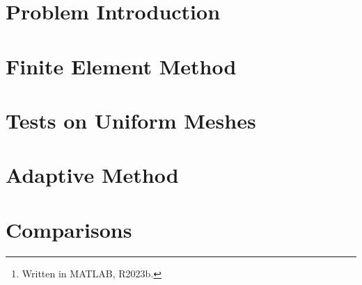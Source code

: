 \documentclass[12pt]{article}
\title{\reporttitle}
\author{Andrea Di Antonio, 858798 \\ \hyperlink{mailto:a.diantonio1@campus.unimib.it}{a.diantonio1@campus.unimib.it}}
\date{Exam session of July 27, 2023 \\ Academic Year 2022-23}
\newcommand{\reporttitle}{Adaptive 1D 1st-order Lagrange FEM}
\begin{document}
	\maketitle
	\thispagestyle{fancy}

	\begin{abstract}
		\begin{center}
			Report for the course \textit{Metodi Numerici per Equazioni alle Derivate Parziali} on the definition and costruction of an \textit{\reporttitle}\footnote{Written in MATLAB, R2023b.} and a subsequent analysis which includes a comparison against a more naive approach by considering a sequence of uniformly refined meshes.
		\end{center}
	\end{abstract}

	\tableofcontents

	\newpage
	\section{Problem Introduction}
	

	\newpage
	\section{Finite Element Method}
	

	\newpage
	\section{Tests on Uniform Meshes}
	

	\newpage
	\section{Adaptive Method}
	

	\newpage
	\section{Comparisons}
	
\end{document}

